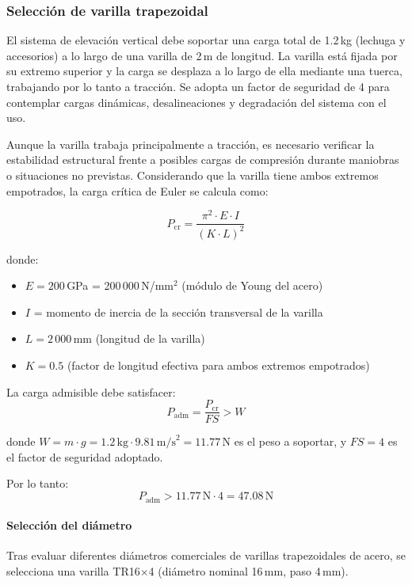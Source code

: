 \subsubsection{Selección de varilla trapezoidal} 
\label{sec:mov_vertical}
El sistema de elevación vertical debe soportar una carga total de 1.2\,kg (lechuga y accesorios) a lo largo de una varilla de 2\,m de longitud. La varilla está fijada por su extremo superior y la carga se desplaza a lo largo de ella mediante una tuerca, trabajando por lo tanto a tracción. Se adopta un factor de seguridad de 4 para contemplar cargas dinámicas, desalineaciones y degradación del sistema con el uso.

Aunque la varilla trabaja principalmente a tracción, es necesario verificar la estabilidad estructural frente a posibles cargas de compresión durante maniobras o situaciones no previstas. Considerando que la varilla tiene ambos extremos empotrados, la carga crítica de Euler se calcula como:

\begin{equation}
P_{\text{cr}} = \frac{\pi^2 \cdot E \cdot I}{(K \cdot L)^2}
\label{eq:euler_pandeo}
\end{equation}

donde:
\begin{itemize}
    \item $E = 200$\,GPa = 200\,000\,N/mm$^2$ (módulo de Young del acero)
    \item $I$ = momento de inercia de la sección transversal de la varilla
    \item $L = 2\,000$\,mm (longitud de la varilla)
    \item $K = 0.5$ (factor de longitud efectiva para ambos extremos empotrados)
\end{itemize}

La carga admisible debe satisfacer:
\begin{equation}
P_{\text{adm}} = \frac{P_{\text{cr}}}{FS} > W
\end{equation}

donde $W = m \cdot g = 1.2\,\text{kg} \cdot 9.81\,\text{m/s}^2 = 11.77$\,N es el peso a soportar, y $FS = 4$ es el factor de seguridad adoptado.

Por lo tanto:
\[P_{\text{adm}} > 11.77\,\text{N} \cdot 4 = 47.08\,\text{N}\]

\paragraph{Selección del diámetro}
Tras evaluar diferentes diámetros comerciales de varillas trapezoidales de acero, se selecciona una varilla TR16$\times$4 (diámetro nominal 16\,mm, paso 4\,mm).

